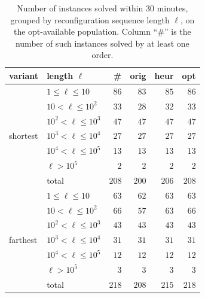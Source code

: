 \documentclass[conference]{IEEEtran}
\newcommand{\OrigDecom}{\textsf{orig}\xspace}
\newcommand{\HeurDecom}{\textsf{heur}\xspace}
\newcommand{\OptDecom}{\textsf{opt}\xspace}
\begin{document}
\begin{table}[t]
  \centering
  \caption{Number of instances solved within $30$ minutes, grouped by
  reconfiguration sequence length $\ell$, on the opt-available population.
  Column ``\#'' is the number of such instances solved by at least one order.}
  \label{tab:reconflen}
  \begin{tabular}{llrrrr}
    \hline
    variant & length $\ell$ & \# & \OrigDecom & \HeurDecom & \OptDecom \\
    \hline
    \multirow{7}{*}{shortest}
      & $1 \le \ell \le 10$        & $86$  & $83$  & $85$  & $86$  \\
      & $10 < \ell \le 10^{2}$     & $33$  & $28$  & $32$  & $33$  \\
      & $10^{2} < \ell \le 10^{3}$ & $47$  & $47$  & $47$  & $47$  \\
      & $10^{3} < \ell \le 10^{4}$ & $27$  & $27$  & $27$  & $27$  \\
      & $10^{4} < \ell \le 10^{5}$ & $13$  & $13$  & $13$  & $13$  \\
      & $\ell > 10^{5}$            & $2$   & $2$   & $2$   & $2$   \\
      \cline{2-6}
      & total                      & $208$ & $200$ & $206$ & $208$ \\
    \hline
    \multirow{7}{*}{farthest}
      & $1 \le \ell \le 10$        & $63$  & $62$  & $63$  & $63$  \\
      & $10 < \ell \le 10^{2}$     & $66$  & $57$  & $63$  & $66$  \\
      & $10^{2} < \ell \le 10^{3}$ & $43$  & $43$  & $43$  & $43$  \\
      & $10^{3} < \ell \le 10^{4}$ & $31$  & $31$  & $31$  & $31$  \\
      & $10^{4} < \ell \le 10^{5}$ & $12$  & $12$  & $12$  & $12$  \\
      & $\ell > 10^{5}$            & $3$   & $3$   & $3$   & $3$   \\
      \cline{2-6}
      & total                      & $218$ & $208$ & $215$ & $218$ \\
    \hline
  \end{tabular}
\end{table}
 
\end{document}
